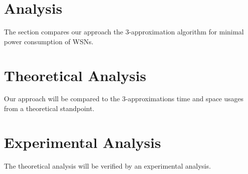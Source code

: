 \section{Analysis}\label{analysis}

The section compares our approach the 3-approximation algorithm for minimal power consumption of WSNs.
\section{Theoretical Analysis}

Our approach will be compared to the 3-approximations time and space usages from a theoretical standpoint.

\section{Experimental Analysis}
The theoretical analysis will be verified by an experimental analysis.
